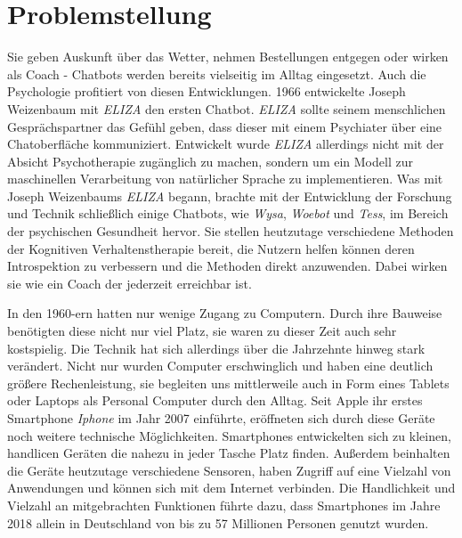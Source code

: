 
\section{Problemstellung}
\label{ch:Problemstellung}


Sie geben Auskunft über das Wetter, nehmen Bestellungen entgegen oder wirken als Coach - Chatbots werden bereits vielseitig im Alltag eingesetzt. Auch die Psychologie profitiert von diesen Entwicklungen. 1966 entwickelte Joseph Weizenbaum mit \emph{ELIZA} den ersten Chatbot. \emph{ELIZA} sollte seinem menschlichen Gesprächspartner das Gefühl geben, dass dieser mit einem Psychiater über eine Chatoberfläche kommuniziert. Entwickelt wurde \emph{ELIZA} allerdings nicht mit der Absicht  Psychotherapie zugänglich zu machen, sondern um ein Modell zur maschinellen Verarbeitung von natürlicher Sprache zu implementieren. Was mit Joseph Weizenbaums \emph{ELIZA} begann, brachte mit der Entwicklung der Forschung und Technik schließlich einige Chatbots, wie \emph{Wysa}, \emph{Woebot} und \emph{Tess}, im Bereich der psychischen Gesundheit hervor. Sie stellen heutzutage verschiedene Methoden der Kognitiven Verhaltenstherapie bereit, die Nutzern helfen können deren Introspektion zu verbessern und die Methoden direkt anzuwenden. Dabei wirken sie wie ein Coach der jederzeit erreichbar ist. 

In den 1960-ern hatten nur wenige Zugang zu Computern. Durch ihre Bauweise benötigten diese nicht nur viel Platz, sie waren zu dieser Zeit auch sehr kostspielig. Die Technik hat sich allerdings über die Jahrzehnte hinweg stark verändert. Nicht nur wurden Computer erschwinglich und haben eine deutlich größere Rechenleistung, sie begleiten uns mittlerweile auch in Form eines Tablets oder Laptops als Personal Computer durch den Alltag. Seit Apple ihr erstes Smartphone \emph{Iphone} im Jahr 2007 einführte, eröffneten sich durch diese Geräte noch weitere technische Möglichkeiten. Smartphones entwickelten sich zu kleinen, handlicen Geräten die nahezu in jeder Tasche Platz finden. Außerdem beinhalten die Geräte heutzutage verschiedene Sensoren, haben Zugriff auf eine Vielzahl von Anwendungen und können sich mit dem Internet verbinden. Die Handlichkeit und Vielzahl an mitgebrachten Funktionen führte dazu, dass Smartphones im Jahre 2018 allein in Deutschland von bis zu 57 Millionen Personen genutzt wurden. 

